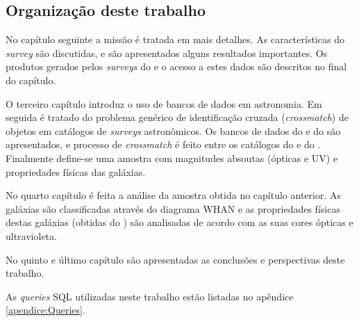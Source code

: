 \subsection{Organização deste trabalho}

No capítulo seguinte a missão \galex é tratada em mais detalhes. As
características do {\em survey} são discutidas, e são apresentados alguns
resultados importantes. Os produtos gerados pelos {\em surveys} do \galex e o
acesso a estes dados são descritos no final do capítulo.

O terceiro capítulo introduz o uso de bancos de dados em astronomia. Em seguida
é tratado do problema genérico de identificação cruzada ({\em crossmatch}) de
objetos em catálogos de {\em surveys} astronômicos. Os bancos de dados do \SDSS
e do \starlight são apresentados, e processo de {\em crossmatch} é feito entre
os catálogos do \SDSS e do \galex. Finalmente define-se uma amostra com
magnitudes absoutas (ópticas e UV) e propriedades físícas das galáxias.

No quarto capítulo é feita a análise da amostra obtida no capítulo anterior. As
galáxias são classificadas através do diagrama WHAN e as propriedades físicas
destas galáxias (obtidas do \starlight) são analisadas de acordo com as suas
cores ópticas e ultravioleta.

No quinto e último capítulo são apresentadas as conclusões e perspectivas deste
trabalho.

As {\em queries} SQL utilizadas neste trabalho estão listadas no apêndice
\ref{apendice:Queries}.

